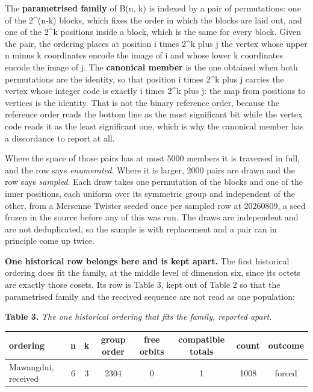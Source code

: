 \documentclass[11pt,a4paper]{article}
\begin{document}
The \textbf{parametrised family} of B(n, k) is indexed by a pair of permutations: one of the 2\textasciicircum{}(n-k) blocks, which fixes the order in which the blocks are laid out, and one of the 2\textasciicircum{}k positions inside a block, which is the same for every block. Given the pair, the ordering places at position i times 2\textasciicircum{}k plus j the vertex whose upper n minus k coordinates encode the image of i and whose lower k coordinates encode the image of j. The \textbf{canonical member} is the one obtained when both permutations are the identity, so that position i times 2\textasciicircum{}k plus j carries the vertex whose integer code is exactly i times 2\textasciicircum{}k plus j: the map from positions to vertices is the identity. That is not the binary reference order, because the reference order reads the bottom line as the most significant bit while the vertex code reads it as the least significant one, which is why the canonical member has a discordance to report at all.

Where the space of those pairs has at most 5000 members it is traversed in full, and the row says \emph{enumerated}. Where it is larger, 2000 pairs are drawn and the row says \emph{sampled}. Each draw takes one permutation of the blocks and one of the inner positions, each uniform over its symmetric group and independent of the other, from a Mersenne Twister seeded once per sampled row at 20260809, a seed frozen in the source before any of this was run. The draws are independent and are not deduplicated, so the sample is with replacement and a pair can in principle come up twice.

\textbf{One historical row belongs here and is kept apart.} The first historical ordering does fit the family, at the middle level of dimension six, since its octets are exactly those cosets. Its row is Table 3, kept out of Table 2 so that the parametrised family and the received sequence are not read as one population:

\textbf{Table 3.} \emph{The one historical ordering that fits the family, reported apart.}

\begingroup\footnotesize\setlength{\tabcolsep}{4pt}
\begin{longtable}[c]{lccccccc}
\textbf{ordering} & \textbf{n} & \textbf{k} & \textbf{group order} & \textbf{free orbits} & \textbf{compatible totals} & \textbf{count} & \textbf{outcome} \\
\hline
Mawangdui, received & 6 & 3 & 2304 & 0 & 1 & 1008 & forced \\
\end{longtable}
\endgroup
\end{document}

